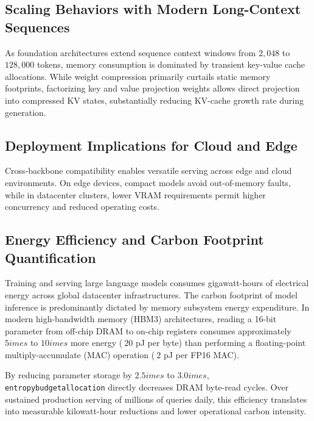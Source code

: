 \subsection{Scaling Behaviors with Modern Long-Context Sequences}
As foundation architectures extend sequence context windows from $2{,}048$ to $128{,}000$ tokens, memory consumption is dominated by transient key-value cache allocations. While weight compression primarily curtails static memory footprints, factorizing key and value projection weights allows direct projection into compressed KV states, substantially reducing KV-cache growth rate during generation.

\subsection{Deployment Implications for Cloud and Edge}
Cross-backbone compatibility enables versatile serving across edge and cloud environments. On edge devices, compact models avoid out-of-memory faults, while in datacenter clusters, lower VRAM requirements permit higher concurrency and reduced operating costs.

\subsection{Energy Efficiency and Carbon Footprint Quantification}
Training and serving large language models consumes gigawatt-hours of electrical energy across global datacenter infrastructures. The carbon footprint of model inference is predominantly dictated by memory subsystem energy expenditure. In modern high-bandwidth memory (HBM3) architectures, reading a 16-bit parameter from off-chip DRAM to on-chip registers consumes approximately $5	imes$ to $10	imes$ more energy ($~20$ pJ per byte) than performing a floating-point multiply-accumulate (MAC) operation ($~2$ pJ per FP16 MAC).

By reducing parameter storage by $2.5	imes$ to $3.0	imes$, \texttt{entropybudgetallocation} directly decreases DRAM byte-read cycles. Over sustained production serving of millions of queries daily, this efficiency translates into measurable kilowatt-hour reductions and lower operational carbon intensity.
